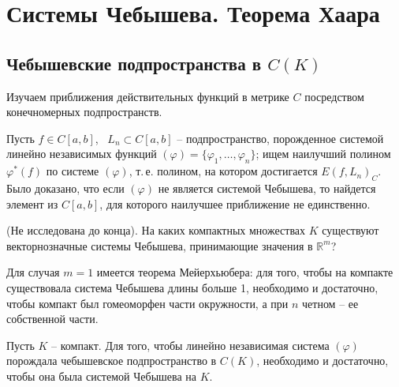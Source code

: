 
\chapter{Системы Чебышева. Теорема Хаара}

\section{Чебышевские подпространства в $C(K)$}

Изучаем приближения действительных функций в метрике $C$ посредством
конечномерных подпространств.

Пусть $f\in C[a,b]$,~ $L_n\subset C[a,b]$ --
подпространство, порожденное системой линейно независимых функций
$(\varphi) = \{\varphi_1,\ldots,\varphi_n\}$;
ищем наилучший
полином $\varphi^*(f)$ по системе $(\varphi)$, т.\,е. полином,
на котором достигается $E(f,L_n)_C.$ Было доказано, что если $(\varphi)$
не является системой Чебышева, то найдется элемент из
$C[a,b]$, для которого наилучшее приближение не единственно.

\begin{task}
(Не исследована до конца). На каких компактных множествах $K$ существуют
векторнозначные системы Чебышева, принимающие значения в $\mathbb R^m$?
\end{task}

Для случая $m=1$ имеется теорема Мейерхьюбера: для того, чтобы на
компакте существовала система Чебышева длины больше 1, необходимо и достаточно,
чтобы компакт был гомеоморфен части окружности, а при $n$ четном --
ее собственной части.

\begin{teo}[А.\,Хаар]
Пусть $K$ -- компакт. Для того, чтобы линейно независимая система {$(\varphi)$}
порождала чебышевское подпространство
{в $C(K)$}, необходимо и достаточно, чтобы она была системой
Чебышева на $K$.
\end{teo}

